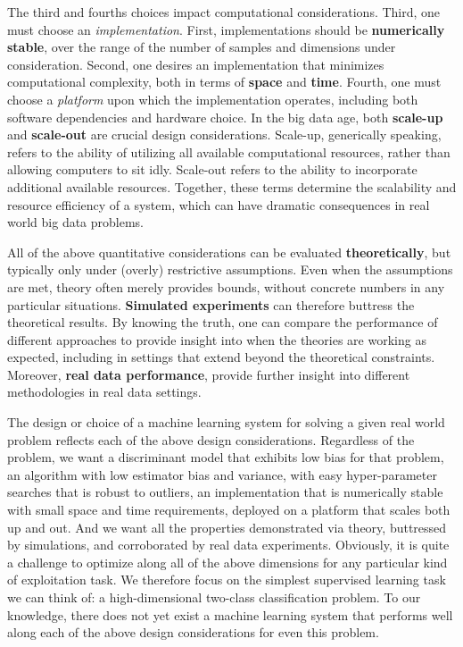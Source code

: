 \documentclass[10pt]{article}
\begin{document}
The third and fourths choices impact computational considerations.  Third, one must choose an \emph{implementation}.  First, implementations should be \textbf{numerically stable}, over the range  of the number of samples and dimensions under consideration.  Second, one desires an implementation that minimizes computational complexity, both in terms of  \textbf{space} and \textbf{time}.
Fourth, one must choose a \emph{platform} upon which the implementation operates,  including both software dependencies and hardware choice.  In the big data age, both \textbf{scale-up} and \textbf{scale-out} are crucial design considerations.  Scale-up, generically speaking, refers to the ability of utilizing all available computational resources, rather than allowing computers to sit idly.  Scale-out refers to the ability to incorporate additional available resources.  Together, these terms determine the scalability and resource efficiency of a system, which can have dramatic consequences in real world big data problems.


All of the above quantitative considerations can be evaluated \textbf{theoretically}, but typically only under (overly) restrictive assumptions.  Even when the assumptions are met, theory often merely provides bounds, without concrete numbers in any particular situations. \textbf{Simulated experiments} can therefore buttress the theoretical results. By knowing the truth, one  can  compare the performance of different approaches to provide insight into when the theories are working as expected, including in settings that extend beyond the theoretical constraints.  Moreover, \textbf{real data performance}, provide further insight into different methodologies in real data settings.


The design or choice of a machine learning system for solving a given real world problem reflects each of the above design considerations.   Regardless of the problem, we want a discriminant model that exhibits low bias for that problem, an algorithm with low estimator bias and variance, with easy hyper-parameter searches that is robust to outliers, an implementation that is numerically stable with small space and time requirements, deployed on a platform that scales both up and out.  And we want all the properties demonstrated via theory, buttressed by simulations, and corroborated by real data experiments.  Obviously, it is quite a challenge to optimize along all of the above dimensions for any particular kind of exploitation task.  We therefore focus  on the simplest supervised learning task we can think of: a high-dimensional two-class classification problem.  To our knowledge, there does not yet exist a machine learning system that performs well along each of the above design considerations for even this problem.
\end{document}
